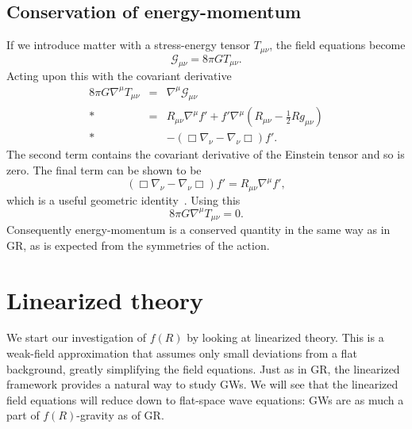\documentclass[aps,prd,amsfonts,amssymb,amsmath,nofootinbib,reprint,showpacs]{revtex4-1}
\newcommand{\recip}[1]{\ensuremath{\frac{1}{#1}}}
\begin{document}
\subsection{Conservation of energy-momentum}

If we introduce matter with a stress-energy tensor $T_{\mu\nu}$, the field equations become
\begin{equation}
\mathcal{G}_{\mu\nu} = 8\pi GT_{\mu\nu}.
\end{equation}
Acting upon this with the covariant derivative
\begin{eqnarray}
8\pi G\nabla^\mu T_{\mu\nu} & = & \nabla^\mu\mathcal{G}_{\mu\nu} \nonumber \\*
 & = & R_{\mu\nu}\nabla^\mu f' + f'\nabla^\mu\left(R_{\mu\nu} - \recip{2}R g_{\mu\nu}\right) \nonumber \\* 
 & & - \left(\Box\nabla_\nu - \nabla_\nu\Box\right)f'.
\end{eqnarray}
The second term contains the covariant derivative of the Einstein tensor and so is zero. The final term can be shown to be
\begin{equation}
\left(\Box\nabla_\nu - \nabla_\nu\Box\right)f' = R_{\mu\nu}\nabla^\mu f',
\end{equation}
which is a useful geometric identity~\cite{Koivisto2006a}. Using this
\begin{equation}
8\pi G\nabla^\mu T_{\mu\nu} = 0.
\end{equation}
Consequently energy-momentum is a conserved quantity in the same way as in GR, as is expected from the symmetries of the action.

\section{Linearized theory\label{sec:Lin}}

We start our investigation of $f(R)$ by looking at linearized theory. This is a weak-field approximation that assumes only small deviations from a flat background, greatly simplifying the field equations. Just as in GR, the linearized framework provides a natural way to study GWs. We will see that the linearized field equations will reduce down to flat-space wave equations: GWs are as much a part of $f(R)$-gravity as of GR.
\end{document}

